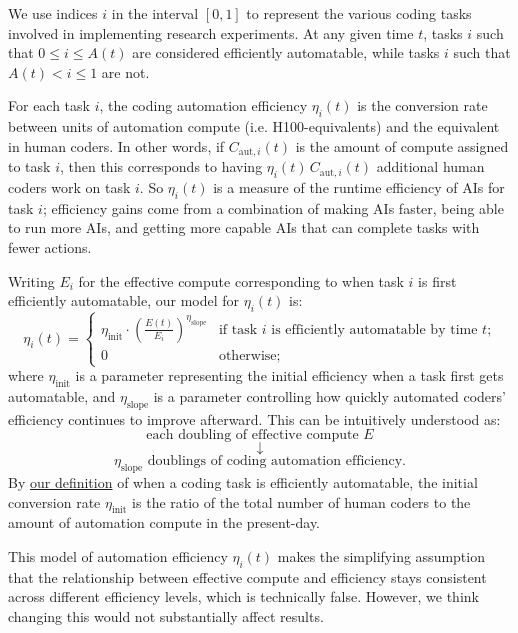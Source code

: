 \documentclass{article}
\theoremstyle{definition}
\begin{document}
We use indices $i$ in the interval $[0,1]$ to represent the various coding tasks involved in implementing research experiments. At any given time $t$, tasks $i$ such that $0 \leq i \leq A(t)$ are considered efficiently automatable, while tasks $i$ such that $A(t) < i \leq 1$ are not.

For each task $i$, the coding automation efficiency $\eta_i(t)$ is the conversion rate between units of automation compute (i.e. H100-equivalents) and the equivalent in human coders. In other words, if $C_{\text{aut}, i}(t)$ is the amount of compute assigned to task $i$, then this corresponds to having $\eta_i(t) \, C_{\text{aut}, i}(t)$ additional human coders work on task $i$. So $\eta_i(t)$ is a measure of the runtime efficiency of AIs for task $i$; efficiency gains come from a combination of making AIs faster, being able to run more AIs, and getting more capable AIs that can complete tasks with fewer actions.


Writing $E_i$ for the effective compute corresponding to when task $i$ is first efficiently automatable, our model for $\eta_i(t)$ is:
\[ \eta_i(t) = \begin{cases} \eta_{\text{init}} \cdot \left(\frac{E(t)}{E_i}\right)^{\eta_{\text{slope}}} & \text{if task $i$ is efficiently automatable by time $t$;}\\ 0 & \text{otherwise;} \end{cases}\]
where $\eta_{\text{init}}$ is a parameter representing the initial efficiency when a task first gets automatable, and $\eta_{\text{slope}}$ is a parameter controlling how quickly automated coders’ efficiency continues to improve afterward. This can be intuitively understood as:
\[ \text{each doubling of effective compute $E$}\]
\[\downarrow\]
\[\text{$\eta_{\text{slope}}$ doublings of coding automation efficiency.}\]
By \hyperref[When is a task considered efficiently automatable?]{our definition} of when a coding task is efficiently automatable, the initial conversion rate $\eta_{\text{init}}$ is the ratio of the total number of human coders to the amount of automation compute in the present-day.

This model of automation efficiency $\eta_i(t)$ makes the simplifying assumption that the relationship between effective compute and efficiency stays consistent across different efficiency levels, which is technically false. However, we think changing this would not substantially affect results.
\end{document}
